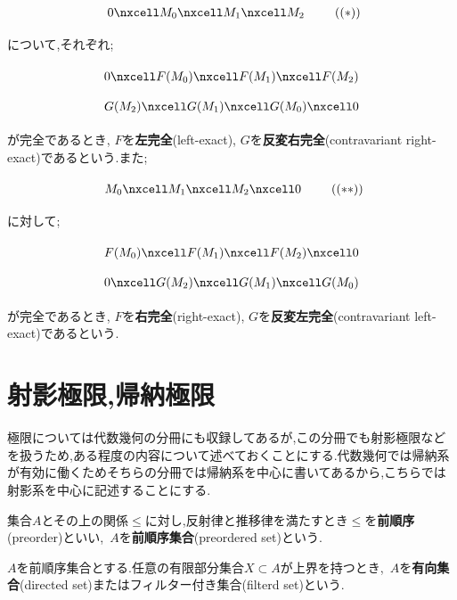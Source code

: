 \[\begin{tikzcd}
	0\nxcell M_0\nxcell M_1\nxcell M_2 
\end{tikzcd}\tag{$(\ast)$}\]

について,それぞれ;

\[\begin{tikzcd}
	0\nxcell F(M_0)\nxcell F(M_1)\nxcell F(M_2)
\end{tikzcd}\]
\[\begin{tikzcd}
	G(M_2)\nxcell G(M_1)\nxcell G(M_0)\nxcell 0
\end{tikzcd}\]

が完全であるとき, $F$を\textbf{左完全}(left-exact), $G$を\textbf{反変右完全}(contravariant right-exact)であるという.また;

\[\begin{tikzcd}
	M_0\nxcell M_1\nxcell M_2\nxcell0
\end{tikzcd}\tag{$(\ast\ast)$}\]

に対して;

\[\begin{tikzcd}
	F(M_0)\nxcell F(M_1)\nxcell F(M_2)\nxcell0
\end{tikzcd}\]
\[\begin{tikzcd}
	0\nxcell G(M_2)\nxcell G(M_1)\nxcell G(M_0)
\end{tikzcd}\]

が完全であるとき, $F$を\textbf{右完全}(right-exact), $G$を\textbf{反変左完全}(contravariant left-exact)であるという.

\section{射影極限,帰納極限}

極限については代数幾何の分冊にも収録してあるが,この分冊でも射影極限などを扱うため,ある程度の内容について述べておくことにする.代数幾何では帰納系が有効に働くためそちらの分冊では帰納系を中心に書いてあるから,こちらでは射影系を中心に記述することにする.

\begin{defi}[前順序]
	集合$A$とその上の関係$\leq$に対し,反射律と推移律を満たすとき$\leq$を\textbf{前順序}(preorder)といい,~$A$を\textbf{前順序集合}(preordered set)という.
\end{defi}
\begin{defi}[有向集合]
	$A$を前順序集合とする.任意の有限部分集合$X\subset A$が上界を持つとき,~$A$を\textbf{有向集合}(directed set)またはフィルター付き集合(filterd set)という.
\end{defi}

